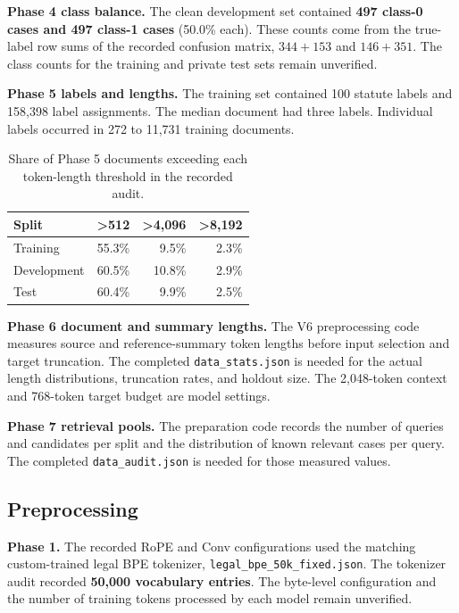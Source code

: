 \textbf{Phase 4 class balance.} The clean development set contained
\textbf{497 class-0 cases and 497 class-1 cases} (50.0\% each). These
counts come from the true-label row sums of the recorded confusion
matrix, \(344+153\) and \(146+351\). The class counts for the training
and private test sets remain unverified.

\textbf{Phase 5 labels and lengths.} The training set contained 100
statute labels and 158,398 label assignments. The median document had
three labels. Individual labels occurred in 272 to 11,731 training
documents.

\begin{table}[t]
\centering
\footnotesize
\caption{Share of Phase 5 documents exceeding each token-length threshold in the recorded audit.}
\label{tab:lsi-lengths}
\begin{tabularx}{\linewidth}{@{}Xrrr@{}}
\toprule
\textbf{Split} & \textbf{>512} & \textbf{>4,096} & \textbf{>8,192} \\
\midrule
Training & 55.3\% & 9.5\% & 2.3\% \\
Development & 60.5\% & 10.8\% & 2.9\% \\
Test & 60.4\% & 9.9\% & 2.5\% \\
\bottomrule
\end{tabularx}
\end{table}

\textbf{Phase 6 document and summary lengths.} The V6 preprocessing code
measures source and reference-summary token lengths before input
selection and target truncation. The completed \texttt{data\_stats.json}
is needed for the actual length distributions, truncation rates, and
holdout size. The 2,048-token context and 768-token target budget are
model settings.

\textbf{Phase 7 retrieval pools.} The preparation code records the
number of queries and candidates per split and the distribution of known
relevant cases per query. The completed \texttt{data\_audit.json} is
needed for those measured values.

\subsection{Preprocessing}\label{preprocessing}

\textbf{Phase 1.} The recorded RoPE and Conv configurations used the
matching custom-trained legal BPE tokenizer,
\texttt{legal\_bpe\_50k\_fixed.json}. The tokenizer audit recorded
\textbf{50,000 vocabulary entries}. The byte-level configuration and the
number of training tokens processed by each model remain unverified.

